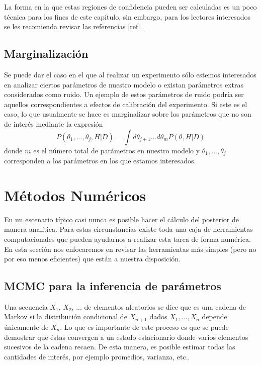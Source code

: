 \documentclass[10.5pt,prb,
               showpacs,            %
               preprintnumbers,     %
               aps,                 %
               prl,          	    %
               letterpaper,             %
               superscriptaddress,      %
               nofootinbib,         %
               tightenlines,        %
               floats,floatfix      %
               ,usenatbib]{revtex4-1}%
\begin{document}
\noindent
La forma en la que estas regiones de confidencia pueden ser calculadas es un poco t\'ecnica para los 
fines de este cap\'itulo, sin embargo, para los lectores interesados se les recomienda revisar las referencias [ref].

\subsection{Marginalizaci\'on}

Se puede dar el caso en el que al realizar un experimento s\'olo estemos interesados en analizar ciertos 
par\'ametros de nuestro modelo o existan par\'ametros extras considerados como ruido. Un ejemplo de 
estos par\'ametros de ruido podr\'ia ser aquellos correspondientes a efectos de calibraci\'on del experimento. 
Si este es el caso, lo que usualmente se hace es marginalizar sobre los par\'ametros que no son de inter\'es 
mediante la expresi\'on
%
	\begin{equation}
		P(\theta_1,...,\theta_j,H|D)=\int d\theta_{j+1}...d\theta_{m}P(\theta,H|D)
	\end{equation}
donde $m$ es el n\'umero total de par\'ametros en nuestro modelo y $\theta_1,...,\theta_j$ 
corresponden a los par\'ametros en los que estamos interesados.

\section{M\'etodos Num\'ericos}

En un escenario t\'ipico casi nunca es posible hacer el c\'alculo del posterior de manera anal\'itica. 
Para estas circunstancias existe toda una caja de herramientas computacionales que pueden 
ayudarnos a realizar esta tarea de forma num\'erica. En esta secci\'on nos enfocaremos en revisar 
las herramientas m\'as simples (pero no por eso menos eficientes) que est\'an a nuestra disposici\'on.

\subsection{MCMC para la inferencia de par\'ametros}

Una secuencia $X_1$, $X_2$, ... de elementos aleatorios se dice que es una cadena de Markov 
si la distribuci\'on condicional de $X_{n+1}$ dados $X_1,...,X_n$ depende \'unicamente de $X_n$. 
Lo que es importante de este proceso es que se puede demostrar que \'estas convergen a un estado 
estacionario donde varios elementos sucesivos de la cadena recaen. De esta manera, es posible estimar 
todas las cantidades de inter\'es, por ejemplo promedios, varianza, etc.. 
\end{document}
